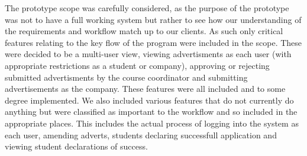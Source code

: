 The prototype scope was carefully considered, as the purpose of the prototype was not
to have a full working system but rather to see how our understanding of the requirements
and workflow match up to our clients. As such only critical features relating to the key
flow of the program were included in the scope. These were decided to be a multi-user view,
viewing advertisments as each user (with appropriate restrictions as a student 
or company), approving or rejecting submitted advertisments by the course coordinator and 
submitting advertisements as the company. These features were all included and to some degree
implemented. We also included various features that do not currently do anything but were
classified as important to the workflow and so included in the appropriate places. This includes 
the actual process of logging into the system as each user, amending adverts, students declaring
successfull application and viewing student declarations of success.


